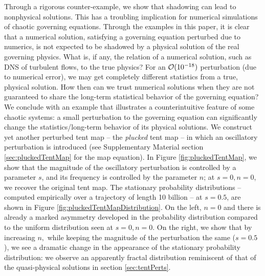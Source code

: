 Through a rigorous counter-example, we show that shadowing can lead
to nonphysical solutions. This has a troubling implication for numerical simulations of chaotic
governing equations.  Through the examples in this paper, it is clear that a numerical solution, satisfying
a governing equation perturbed due to numerics, is not 
expected to be shadowed by a
physical solution of the real governing physics.  What is, if any, the
relation of a numerical solution, such as DNS of turbulent flows, to
the true physics? For an ${\cal O}(10^{-18})$ 
perturbation (due to numerical error), 
we may get completely different statistics from a true, physical solution. How then can we trust numerical solutions when they are not guaranteed to share the long-term statistical behavior of the governing equation? 
We conclude with an example that illustrates a counterintuitive feature of some chaotic systems: a small perturbation to the 
governing equation can significantly change the statistics/long-term 
behavior of its physical solutions. We construct yet another 
perturbed tent map -- the \emph{plucked} 
tent map -- in which an oscillatory perturbation is introduced (see Supplementary Material section \ref{sec:pluckedTentMap} for the map equation). In Figure \ref{fig:pluckedTentMap}, we show that the magnitude of the oscillatory perturbation is controlled by a parameter $s$, and its frequency is controlled by the parameter $n$; at $s=0,n=0$, we recover the original tent map. The stationary probability distributions -- computed empirically over a trajectory of length 10 billion -- at $s=0.5$, are shown in Figure \ref{fig:pluckedTentMapDistribution}. On the left, $n=0$ and there is already a marked asymmetry developed in the probability distribution compared to the uniform distribution seen at $s=0, n=0$. On the right, we show that by increasing $n,$ while keeping the magnitude of the perturbation the same ($s=0.5$), we see a dramatic change in the appearance of the stationary probability distribution: we observe an apparently fractal distribution reminiscent of that of the quasi-physical solutions in 
section \ref{sec:tentPerts}.

